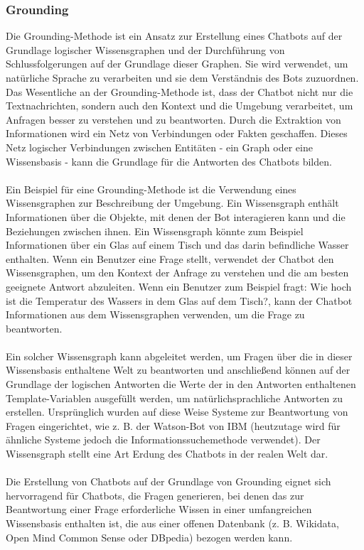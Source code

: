 \subsubsection{Grounding}
Die Grounding-Methode ist ein Ansatz zur Erstellung eines Chatbots auf der Grundlage logischer Wissensgraphen und der Durchführung von Schlussfolgerungen auf der Grundlage dieser Graphen. \cite{diana_conversational_2011}
Sie wird verwendet, um natürliche Sprache zu verarbeiten und sie dem Verständnis des Bots zuzuordnen. Das Wesentliche an der Grounding-Methode ist, dass der Chatbot nicht nur die Textnachrichten, sondern auch den Kontext und die Umgebung verarbeitet, um Anfragen besser zu verstehen und zu beantworten. 
Durch die Extraktion von Informationen wird ein Netz von Verbindungen oder Fakten geschaffen. Dieses Netz logischer Verbindungen zwischen Entitäten - ein Graph oder eine Wissensbasis - kann die Grundlage für die Antworten des Chatbots bilden.\\\\
Ein Beispiel für eine Grounding-Methode ist die Verwendung eines Wissensgraphen zur Beschreibung der Umgebung. 
Ein Wissensgraph enthält Informationen über die Objekte, mit denen der Bot interagieren kann und die Beziehungen zwischen ihnen. 
Ein Wissensgraph könnte zum Beispiel Informationen über ein Glas auf einem Tisch und das darin befindliche Wasser enthalten. 
Wenn ein Benutzer eine Frage stellt, verwendet der Chatbot den Wissensgraphen, um den Kontext der Anfrage zu verstehen und die am besten geeignete Antwort abzuleiten. 
Wenn ein Benutzer zum Beispiel fragt: \glqq{}Wie hoch ist die Temperatur des Wassers in dem Glas auf dem Tisch?\grqq{}, kann der Chatbot Informationen aus dem Wissensgraphen verwenden, um die Frage zu beantworten.\\\\
Ein solcher Wissensgraph kann abgeleitet werden, um Fragen über die in dieser Wissensbasis enthaltene Welt zu beantworten und anschließend können auf der Grundlage der logischen Antworten die Werte der in den Antworten enthaltenen Template-Variablen ausgefüllt werden, um natürlichsprachliche Antworten zu erstellen. 
Ursprünglich wurden auf diese Weise Systeme zur Beantwortung von Fragen eingerichtet, wie z. B. der Watson-Bot von IBM (heutzutage wird für ähnliche Systeme jedoch die Informationssuchemethode verwendet). 
Der Wissensgraph stellt eine Art \glqq{}Erdung\grqq{} des Chatbots in der realen Welt dar.\\\\
Die Erstellung von Chatbots auf der Grundlage von \glqq{}Grounding\grqq{} eignet sich hervorragend für Chatbots, die Fragen generieren, bei denen das zur Beantwortung einer Frage erforderliche Wissen in einer umfangreichen Wissensbasis enthalten ist, die aus einer offenen Datenbank (z. B. Wikidata, Open Mind Common Sense oder DBpedia) bezogen werden kann.\\\\
